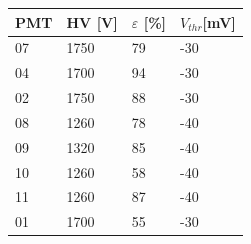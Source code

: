 \begin{tabular}{llll}
\hline
PMT & HV {[}V{]} & $\varepsilon$ {[}\%{]} & $V_{thr}${[}mV{]} \\ \hline
07  & 1750       & 79              & -30               \\
04  & 1700       & 94              & -30               \\
02  & 1750       & 88              & -30               \\
08  & 1260       & 78              & -40               \\
09  & 1320       & 85              & -40               \\
10  & 1260       & 58              & -40               \\
11  & 1260       & 87              & -40               \\
01  & 1700       & 55              & -30               \\ \hline
\end{tabular}